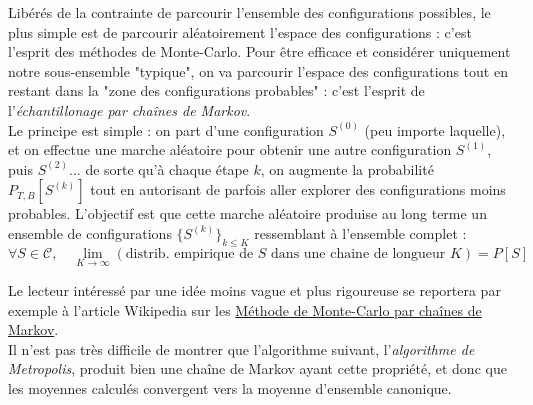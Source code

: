\documentclass{book}
\begin{document}
Libérés de la contrainte de parcourir l’ensemble des configurations possibles, le plus simple est de parcourir aléatoirement l'espace des configurations : c'est l'esprit des méthodes de Monte-Carlo. Pour être efficace et considérer uniquement notre sous-ensemble "typique", on va parcourir l'espace des configurations tout en restant dans la "zone des configurations probables" : c'est l'esprit de l'\emph{échantillonage par chaînes de Markov}.\\

Le principe est simple : on part d'une configuration $S^{(0)}$ (peu importe laquelle), et on effectue une marche aléatoire pour obtenir une autre configuration $S^{(1)}$, puis $S^{(2)}$... de sorte qu'à chaque étape $k$, on augmente la probabilité $P_{T,B}[S^{(k)}]$ tout en autorisant de parfois aller explorer des configurations moins probables. L'objectif est que cette marche aléatoire produise au long terme un ensemble de configurations $\{ S^{(k)} \}_{k\leq K}$ ressemblant à l'ensemble complet :
\begin{equation}
\forall S\in\mathcal{C},\quad\lim_{K\to\infty} (\text{distrib. empirique de $S$ dans une chaine de longueur $K$}) = P[S] \label{eq:convergence-proba}
\end{equation}

Le lecteur intéressé par une idée moins vague et plus rigoureuse se reportera par exemple à l'article Wikipedia sur les \href{https://fr.wikipedia.org/wiki/M%C3%A9thode_de_Monte-Carlo_par_cha%C3%AEnes_de_Markov}{Méthode de Monte-Carlo par chaînes de Markov}.\\

Il n'est pas très difficile de montrer que l'algorithme suivant, l'\emph{algorithme de Metropolis}, produit bien une chaîne de Markov ayant cette propriété, et donc que les moyennes calculés convergent vers la moyenne d'ensemble canonique.\\
\end{document}
